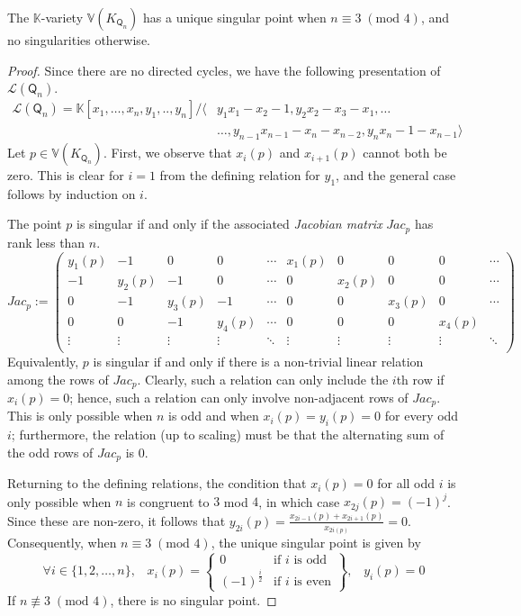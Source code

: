 \documentclass[ALCO,published]{cedram}
\numberwithin{equation}{section}
\renewcommand{\L}{\mathcal{L}}%
\newcommand{\1}{^{-1}}
\def\Q{\mathsf{Q}}
\newcommand{\gmat}[2][ccccccccccccccccccccccccccccccccc]{\left(\begin{array}{#1} #2\\ \end{array}\right)}
\begin{document}
\begin{prop}
The $\mathbb{K}$-variety $\mathbb{V}(K_{\Q_n})$ has a unique singular point when $n\equiv 3\; (\text{mod }4)$, and no singularities otherwise.
\end{prop}

\begin{proof}
Since there are no directed cycles, we have the following presentation of $\L(\Q_n)$.
\begin{align*}
\L(\Q_n) = \mathbb{K}[x_1,\dots,x_n,y_1,..,y_n]/\langle &y_1x_1-x_2-1,y_2x_2-x_3-x_1,\dots\\
&\dots,y_{n-1}x_{n-1}-x_n-x_{n-2},y_nx_n-1-x_{n-1}\rangle
\end{align*}
Let $p\in \mathbb{V}(K_{\Q_n})$.  First, we observe that $x_i(p)$ and $x_{i+1}(p)$ cannot both be zero.  This is clear for $i=1$ from the defining relation for $y_1$, and the general case follows by induction on $i$.

The point $p$ is singular if and only if the associated 
\emph{Jacobian matrix} $Jac_p$ has rank less than $n$.
%
\[ Jac_p:=\gmat{ 
y_1(p) & -1 & 0 & 0 & \cdots  & x_1(p) & 0 & 0 & 0 & \cdots 
\\ -1 & y_2(p) & -1 & 0 & \cdots & 0 & x_2(p) & 0 & 0& \cdots
\\ 0 & -1 & y_3(p) & -1 & \cdots & 0 & 0 & x_3(p) & 0 & \cdots
\\ 0 & 0 & -1 & y_4(p) & \cdots & 0 & 0 & 0 & x_4(p)
\\ \vdots & \vdots & \vdots & \vdots & \ddots & \vdots & \vdots & \vdots & \vdots & \ddots 
}\]
Equivalently, $p$ is singular if and only if there is a non-trivial linear relation among the rows of $Jac_p$.  Clearly, such a relation can only include the $i$th row if $x_i(p)=0$; hence, such a relation can only involve non-adjacent rows of $Jac_p$.  This is only possible when $n$ is odd and when $x_i(p)=y_i(p)=0$ for every odd $i$; furthermore, the relation (up to scaling) must be that the alternating sum of the odd rows of $Jac_p$ is $0$.

Returning to the defining relations, the condition that $x_i(p)=0$ for all odd $i$ is only possible when $n$ is congruent to $3$ mod $4$, in which case $x_{2j}(p)=(-1)^j$.  Since these are non-zero, it follows that $y_{2i}(p)=\frac{x_{2i-1}(p)+x_{2i+1}(p)}{x_{2i(p)}} = 0$.  Consequently, when $n\equiv 3\;(\text{mod }4)$, the unique singular point is given by
\[\forall i\in \{1,2,\dots,n\},\;\;\; x_i(p) = \left\{ \begin{array}{cc}
0 & \text{if $i$ is odd} \\
(-1)^{\frac{i}{2}} & \text{if $i$ is even}
\end{array}\right\},\;\;\; y_i(p) =0 \]
If $n\not\equiv 3\;(\text{mod }4)$, there is no singular point.
\end{proof}
\end{document}
